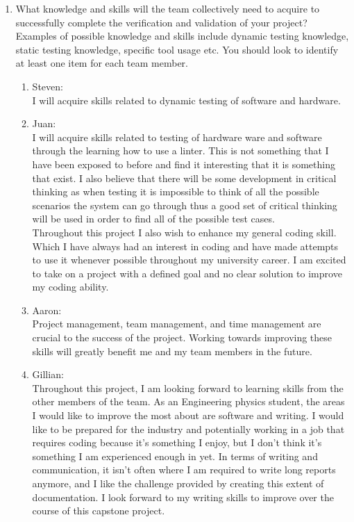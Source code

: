 \documentclass[12pt, titlepage]{article}
\begin{document}
\begin{enumerate}
  \item What knowledge and skills will the team collectively need to acquire to
  successfully complete the verification and validation of your project?
  Examples of possible knowledge and skills include dynamic testing knowledge,
  static testing knowledge, specific tool usage etc.  You should look to
  identify at least one item for each team member.

  \begin{enumerate}
    \item{Steven:}\\
    I will acquire skills related to dynamic testing of software and hardware. \\
    \item{Juan:}\\
    I will acquire skills related to testing of hardware ware and software through the learning
   how to use a linter. This is not something that I have been exposed to before and find it interesting 
   that it is something that exist. I also believe that there will be some development in critical thinking 
   as when testing it is impossible to think of all the possible scenarios the system can go through thus 
   a good set of critical thinking will be used in order to find all of the possible test cases.\\
    
    Throughout this project I also wish to enhance my general coding skill. Which I have always had an interest in coding and have made attempts to use it whenever possible throughout my university career. I am excited to 
    take on a project with a defined goal and no clear solution to improve my coding ability.
    \item{Aaron:}\\
    Project management, team management, and time management are 
    crucial to the success of the project. Working towards improving these skills will
    greatly benefit me and my team members in the future.\\
    \item {Gillian:}\\
    Throughout this project, I am looking forward to learning skills from the other members of the team. As an Engineering physics student, the areas I would like to improve the most about are software and writing. I would like to be prepared for the industry and potentially working in a job that requires coding because it’s something I enjoy, but I don’t think it’s something I am experienced enough in yet. 
    \noindent In terms of writing and communication, it isn’t often where I am required to write long reports anymore, and I like the challenge provided by creating this extent of documentation. I look forward to my writing skills to improve over the course of this capstone project. 


\end{enumerate}
\end{enumerate}
\end{document}
